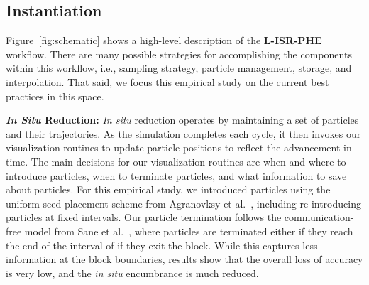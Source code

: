 \subsection{Instantiation}
\label{sec:instantiation}

Figure~\ref{fig:schematic} shows a high-level description of the
\textbf{L-ISR-PHE}  workflow.
%
There are many possible strategies for accomplishing the components
within this workflow, i.e., sampling strategy, particle management,
storage, and interpolation.
%
That said, we focus this empirical study on 
the current best practices in this space.
%

%

\textbf{\textit{In Situ} Reduction:}
\textit{In situ} reduction operates by maintaining a set of particles and their
trajectories.
%
As the simulation completes each cycle, it then invokes our visualization 
routines to update particle positions to reflect the advancement in time.
%
The main decisions for our visualization routines
 are when and where to introduce particles,
when to terminate particles, and what information to save about particles.
%
For this empirical study, we introduced particles using the 
uniform seed placement scheme from Agranovksy et al.~\cite{agranovsky2014improved}, including re-introducing particles at fixed intervals.
%
Our particle termination follows the 
communication-free model from Sane et al.~\cite{sane2020scalable}, where
particles are terminated either if they reach the end of the interval
of if they exit the block.
%
While this captures less information at the block boundaries, results show
that the overall loss of accuracy is very low, 
and the \textit{in situ} encumbrance is much reduced.
%

